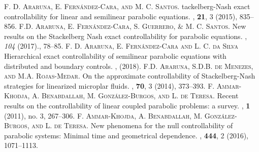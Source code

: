 \documentclass[preprint,10pt]{article}
\numberwithin{equation}{section}
\numberwithin{theorem}{section}
\begin{document}
{\begin{thebibliography}{7}
\textsc{F. D. Araruna, E. Fern\'andez-Cara, and M. C. Santos.}
tackelberg-{N}ash exact controllability for linear and semilinear parabolic equations.
, \textbf{21}, 3 (2015), 835--856.
%
\textsc{F.D. Araruna, E. Fern\'andez-Cara, S. Guerrero, \& M. C.  Santos.} 
\newblock New results on the Stackelberg Nash exact controllability for parabolic equations. 
, \textit{104} (2017)., 78--85. 
%
\textsc{F. D. Araruna, E. Fern\'andez-Cara and L. C. da Silva}
\newblock Hierarchical exact controllability of semilinear parabolic equations with distributed and boundary controls.
, (2018). 
%
\textsc{F.D. Araruna,  S.D.B. de Menezes, and  M.A. Rojas-Medar.}
\newblock On the approximate controllability of Stackelberg-Nash strategies for linearized microplar fluids.
,  \textbf{70},  3 (2014), 373--393.
%
\textsc{F. Ammar-Khodja, A. Benabdallah, M. Gonz\'alez-Burgos, and L. de Teresa.}
\newblock Recent results on the controllability of linear coupled parabolic problems: a survey. 
, \textbf{1} (2011), no. 3, 267--306.
%
\textsc{F. Ammar-Khojda, A. Benabdallah, M. Gonz\'alez-Burgos, and L. de Teresa.}
\newblock New phenomena for the null controllability of parabolic systems: Minimal time and geometrical dependence.
, \textbf{444}, 2 (2016), 1071--1113.


\end{thebibliography}}
\end{document}
